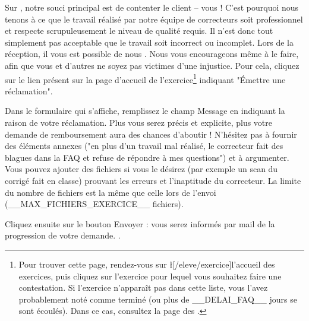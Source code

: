 ﻿Sur \eDevoir, notre souci principal est de contenter le client -- vous ! C'est pourquoi nous tenons à ce que le travail réalisé par notre équipe de correcteurs soit professionnel et respecte scrupuleusement le niveau de qualité requis. Il n'est donc tout simplement pas acceptable que le travail soit incorrect ou incomplet. Lors de la réception, il vous est possible de nous . Nous vous encourageons même à le faire, afin que vous et d'autres ne soyez pas victimes d'une injustice.
Pour cela, cliquez sur le lien présent sur la page d'accueil de l'exercice\footnote{Pour trouver cette page, rendez-vous sur \l[/eleve/exercice]{l'accueil des exercices}, puis cliquez sur l'exercice pour lequel vous souhaitez faire une contestation. Si l'exercice n'apparaît pas dans cette liste, vous l'avez probablement noté comme terminé (ou plus de __DELAI_FAQ__ jours se sont écoulés). Dans ce cas, consultez la page des .} indiquant "Émettre une réclamation".

Dans le formulaire qui s'affiche, remplissez le champ Message en indiquant la raison de votre réclamation. Plus vous serez précis et explicite, plus votre demande de remboursement aura des chances d'aboutir ! N'hésitez pas à fournir des éléments annexes ("en plus d'un travail mal réalisé, le correcteur fait des blagues dans la FAQ et refuse de répondre à mes questions") et à argumenter.
Vous pouvez ajouter des fichiers si vous le désirez (par exemple un scan du corrigé fait en classe) prouvant les erreurs et l'inaptitude du correcteur. La limite du nombre de fichiers est la même que celle lors de l'envoi (__MAX_FICHIERS_EXERCICE__ fichiers).

Cliquez ensuite sur le bouton Envoyer : vous serez informés par mail de la progression de votre demande. .